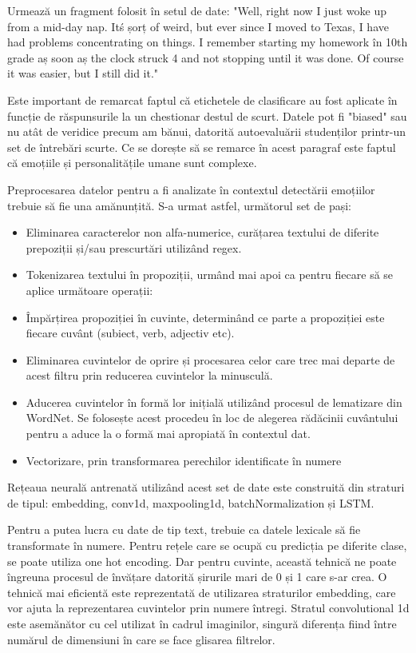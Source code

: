 \documentclass[a4paper, 12pt]{report}
\begin{document}
	Urmează un fragment folosit în setul de date: "Well, right now I just woke up from a mid-day nap. It\'s șorț of weird, but ever since I moved to Texas, I have had problems concentrating on things. I remember starting my homework în  10th grade aș soon aș the clock struck 4 and not stopping until it was done. Of course it was easier, but I still did it."
	
	Este important de remarcat faptul că etichetele de clasificare au fost aplicate în funcție de răspunsurile la un chestionar destul de scurt. Datele pot fi "biased" sau nu atât de veridice precum am bănui, datorită autoevaluării studenților printr-un set de întrebări scurte. Ce se dorește să se remarce în acest paragraf este faptul că emoțiile și personalitățile umane sunt complexe.
	
	Preprocesarea datelor pentru a fi analizate în contextul detectării emoțiilor trebuie să fie una amănunțită. S-a urmat astfel, următorul set de pași:
	\begin{itemize}
		\item Eliminarea caracterelor non alfa-numerice, curățarea textului de diferite prepoziții și/sau prescurtări utilizând regex.
		\item Tokenizarea textului în propoziții, urmând mai apoi ca pentru fiecare să se aplice următoare operații:
		\item Împărțirea propoziției în cuvinte, determinând ce parte a propoziției este fiecare cuvânt (subiect, verb, adjectiv etc).
		\item Eliminarea cuvintelor de oprire și procesarea celor care trec mai departe de acest filtru prin reducerea cuvintelor la minusculă.
		\item Aducerea cuvintelor în formă lor inițială utilizând procesul de lematizare din WordNet. Se folosește acest procedeu în loc de alegerea rădăcinii cuvântului pentru a aduce la o formă mai apropiată în contextul dat.
		\item Vectorizare, prin transformarea perechilor identificate în numere
	\end{itemize}
	
	\bigskip
	
 	Rețeaua neurală antrenată utilizând acest set de date este construită din straturi de tipul: embedding, conv1d, maxpooling1d, batchNormalization și LSTM.

	Pentru a putea lucra cu date de tip text, trebuie ca datele lexicale să fie transformate în numere. Pentru rețele care se ocupă cu predicția pe diferite clase, se poate utiliza one hot encoding. Dar pentru cuvinte, această tehnică ne poate îngreuna procesul de învățare datorită șirurile mari de 0 și 1 care s-ar crea. O tehnică mai eficientă este reprezentată de utilizarea straturilor embedding, care vor ajuta la reprezentarea cuvintelor prin numere întregi. Stratul convolutional 1d este asemănător cu cel utilizat în cadrul imaginilor, singură diferența fiind între numărul de dimensiuni în care se face glisarea filtrelor.
\end{document}
